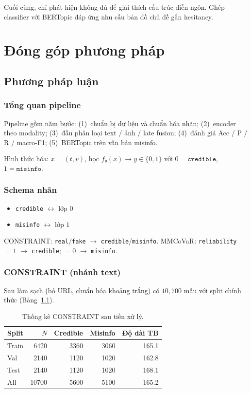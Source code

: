 \documentclass[12pt, a4paper]{report}
\begin{document}
Cuối cùng, chỉ phát hiện không đủ để giải thích cấu trúc diễn ngôn.
Ghép classifier với BERTopic đáp ứng nhu cầu bản đồ chủ đề gắn hesitancy.

\chapter{Đóng góp phương pháp}
\label{chap:contribution}

\section{Phương pháp luận}
\label{sec:methodology}

\subsection{Tổng quan pipeline}

Pipeline gồm năm bước: (1)~chuẩn bị dữ liệu và chuẩn hóa nhãn;
(2)~encoder theo modality;
(3)~đầu phân loại text / ảnh / late fusion;
(4)~đánh giá Acc / P / R / macro-F1;
(5)~BERTopic trên văn bản misinfo.

Hình thức hóa: \(x=(t,v)\), học \(f_\theta(x)\rightarrow y\in\{0,1\}\) với \(0=\texttt{credible}\), \(1=\texttt{misinfo}\).

\subsection{Schema nhãn}

\begin{itemize}
  \item \texttt{credible} \(\leftrightarrow\) lớp \(0\)
  \item \texttt{misinfo} \(\leftrightarrow\) lớp \(1\)
\end{itemize}
CONSTRAINT: \texttt{real}/\texttt{fake} \(\rightarrow\) \texttt{credible}/\texttt{misinfo}.
MMCoVaR: \texttt{reliability}$=1$ \(\rightarrow\) \texttt{credible}; \(=0\) \(\rightarrow\) \texttt{misinfo}.

\subsection{CONSTRAINT (nhánh text)}

Sau làm sạch (bỏ URL, chuẩn hóa khoảng trắng) có $10{,}700$ mẫu với split chính thức (Bảng~\ref{tab:constraint-stats}).

\begin{table}[htbp]
\centering
\caption{Thống kê CONSTRAINT sau tiền xử lý.}
\label{tab:constraint-stats}
\begin{tabular}{lrrrr}
\hline
Split & $N$ & Credible & Misinfo & Độ dài TB \\
\hline
Train & 6420 & 3360 & 3060 & 165.1 \\
Val   & 2140 & 1120 & 1020 & 162.8 \\
Test  & 2140 & 1120 & 1020 & 168.1 \\
\hline
All   & 10700 & 5600 & 5100 & 165.2 \\
\hline
\end{tabular}
\end{table}
\end{document}
